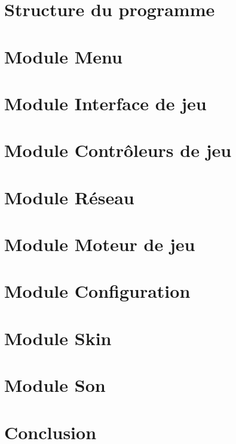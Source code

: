 \section{Structure du programme}%


\newpage

\section{Module Menu}

\newpage

\section{Module Interface de jeu}

\newpage

\section{Module Contrôleurs de jeu}

\newpage

\section{Module Réseau}

\newpage

\section{Module Moteur de jeu}

\newpage

\section{Module Configuration}

\newpage

\section{Module Skin}

\newpage

\section{Module Son}

\newpage

\section*{Conclusion}


\newpage


\appendix

\renewcommand{\appendixpagename}{Annexes}
\renewcommand{\appendixtocname}{Annexes}

\noappendicestocpagenum

\appendixpage
\addappheadtotoc


